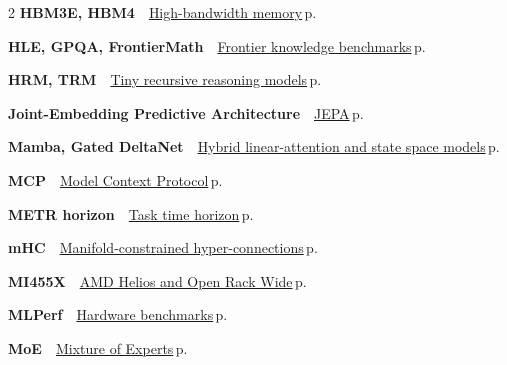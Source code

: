\documentclass[10pt,a4paper,openany]{report}
\begin{document}
\begin{multicols}{2}
\textbf{\sffamily\color{accent}HBM3E, HBM4}\ \ \hyperref[c:hardware-8]{High-bandwidth memory}\,{\color{muted}\scriptsize p.\,\pageref{c:hardware-8}}\par\vspace{2pt}
\textbf{\sffamily\color{accent}HLE, GPQA, FrontierMath}\ \ \hyperref[c:evals-6]{Frontier knowledge benchmarks}\,{\color{muted}\scriptsize p.\,\pageref{c:evals-6}}\par\vspace{2pt}
\textbf{\sffamily\color{accent}HRM, TRM}\ \ \hyperref[c:arch-10]{Tiny recursive reasoning models}\,{\color{muted}\scriptsize p.\,\pageref{c:arch-10}}\par\vspace{2pt}
\textbf{\sffamily\color{accent}Joint-Embedding Predictive Architecture}\ \ \hyperref[c:embodied-3]{JEPA}\,{\color{muted}\scriptsize p.\,\pageref{c:embodied-3}}\par\vspace{2pt}
\textbf{\sffamily\color{accent}Mamba, Gated DeltaNet}\ \ \hyperref[c:arch-4]{Hybrid linear-attention and state space models}\,{\color{muted}\scriptsize p.\,\pageref{c:arch-4}}\par\vspace{2pt}
\textbf{\sffamily\color{accent}MCP}\ \ \hyperref[c:protocols-0]{Model Context Protocol}\,{\color{muted}\scriptsize p.\,\pageref{c:protocols-0}}\par\vspace{2pt}
\textbf{\sffamily\color{accent}METR horizon}\ \ \hyperref[c:evals-8]{Task time horizon}\,{\color{muted}\scriptsize p.\,\pageref{c:evals-8}}\par\vspace{2pt}
\textbf{\sffamily\color{accent}mHC}\ \ \hyperref[c:arch-3]{Manifold-constrained hyper-connections}\,{\color{muted}\scriptsize p.\,\pageref{c:arch-3}}\par\vspace{2pt}
\textbf{\sffamily\color{accent}MI455X}\ \ \hyperref[c:hardware-1]{AMD Helios and Open Rack Wide}\,{\color{muted}\scriptsize p.\,\pageref{c:hardware-1}}\par\vspace{2pt}
\textbf{\sffamily\color{accent}MLPerf}\ \ \hyperref[c:hardware-16]{Hardware benchmarks}\,{\color{muted}\scriptsize p.\,\pageref{c:hardware-16}}\par\vspace{2pt}
\textbf{\sffamily\color{accent}MoE}\ \ \hyperref[c:arch-0]{Mixture of Experts}\,{\color{muted}\scriptsize p.\,\pageref{c:arch-0}}\par\vspace{2pt}

\end{multicols}
\end{document}
